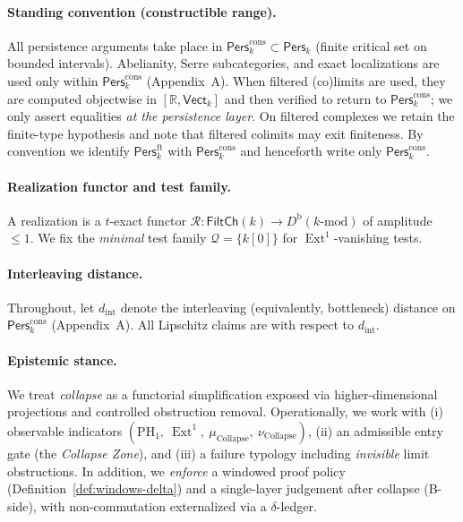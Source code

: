 \documentclass[11pt]{article}
\DeclareMathOperator{\Ext}{Ext}
\newcommand{\Pers}{\mathsf{Pers}}
\numberwithin{equation}{section}
\theoremstyle{definition}
\begin{document}
\paragraph{Standing convention (constructible range).}
All persistence arguments take place in $\Pers^{\mathrm{cons}}_k\subset\Pers_k$ (finite critical set on bounded intervals). Abelianity, Serre subcategories, and exact localizations are used only within $\Pers^{\mathrm{cons}}_k$ (Appendix~A). When filtered (co)limits are used, they are computed objectwise in $[\mathbb{R},\mathsf{Vect}_k]$ and then verified to return to $\Pers^{\mathrm{cons}}_k$; we only assert equalities \emph{at the persistence layer}. On filtered complexes we retain the finite-type hypothesis and note that filtered colimits may exit finiteness. By convention we identify $\Pers^{\mathrm{ft}}_k$ with $\Pers^{\mathrm{cons}}_k$ and henceforth write only $\Pers^{\mathrm{cons}}_k$.

\paragraph{Realization functor and test family.}
A realization is a $t$-exact functor $\mathcal{R}:\mathsf{FiltCh}(k)\to D^{\mathrm{b}}(k\text{-mod})$ of amplitude $\le 1$. We fix the \emph{minimal} test family $\mathcal{Q}=\{k[0]\}$ for $\Ext^1$-vanishing tests.

\paragraph{Interleaving distance.}
Throughout, let $d_{\mathrm{int}}$ denote the interleaving (equivalently, bottleneck) distance on $\Pers^{\mathrm{cons}}_k$ (Appendix~A). All Lipschitz claims are with respect to $d_{\mathrm{int}}$.

\paragraph{Epistemic stance.}
We treat \emph{collapse} as a functorial simplification exposed via higher-dimensional projections and controlled obstruction removal. Operationally, we work with (i) observable indicators $(\mathrm{PH}_1,\ \Ext^1,\ \mu_{\mathrm{Collapse}},\ \nu_{\mathrm{Collapse}})$, (ii) an admissible entry gate (the \emph{Collapse Zone}), and (iii) a failure typology including \emph{invisible} limit obstructions. In addition, we \emph{enforce} a windowed proof policy (Definition~\ref{def:windows-delta}) and a single-layer judgement after collapse (B-side), with non-commutation externalized via a $\delta$-ledger.
\end{document}
